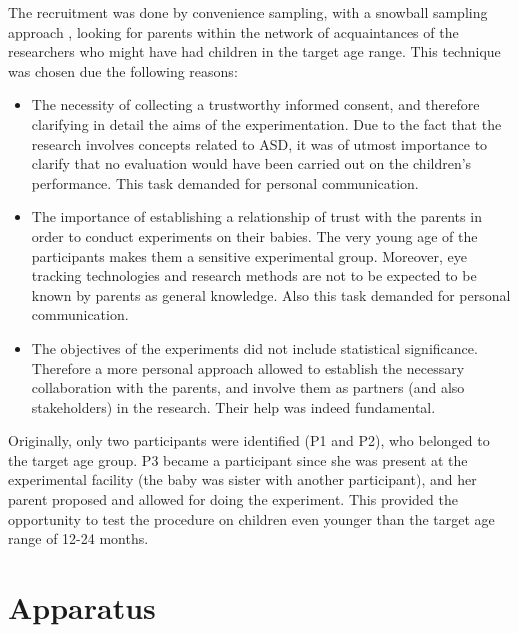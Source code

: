 The recruitment was done by convenience sampling, with a snowball sampling approach \citep[pp. 496, 506]{baxter2015understanding}, looking for parents within the network of acquaintances of the researchers who might have had children in the target age range. This technique was chosen due the following reasons:
\begin{itemize}
    \item The necessity of collecting a trustworthy informed consent, and therefore clarifying in detail the aims of the experimentation. Due to the fact that the research involves concepts related to ASD, it was of utmost importance to clarify that no evaluation would have been carried out on the children’s performance. This task demanded for personal communication.
    \item The importance of establishing a relationship of trust with the parents in order to conduct experiments on their babies. The very young age of the participants makes them a sensitive experimental group. Moreover, eye tracking technologies and research methods are not to be expected to be known by parents as general knowledge. Also this task demanded for personal communication.
    \item The objectives of the experiments did not include statistical significance. Therefore a more personal approach allowed to establish the necessary collaboration with the parents, and involve them as partners (and also stakeholders) in the research. Their help was indeed fundamental.
\end{itemize}

Originally, only two participants were identified (P1 and P2), who belonged to the target age group. P3 became a participant since she was present at the experimental facility (the baby was sister with another participant), and her parent proposed and allowed for doing the experiment. This provided the opportunity to test the procedure on children even younger than the target age range of 12-24 months.




\section{Apparatus}
\label{sec:expapparatus}

